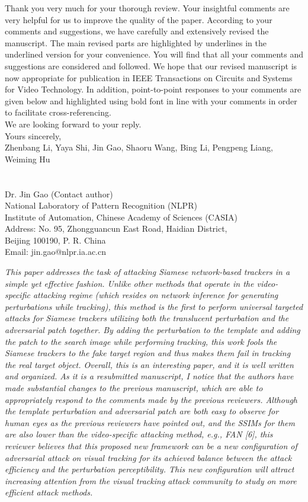 \documentclass[12pt]{article}
\begin{document}
Thank you very much for your thorough review. Your insightful comments are very helpful for us to improve the quality of the paper. According to your comments and suggestions, we have carefully and extensively revised the manuscript. The main revised parts are highlighted by underlines in the underlined version for your convenience. You will find that all your comments and suggestions are considered and followed. We hope that our revised manuscript is now appropriate for publication in IEEE Transactions on Circuits and Systems for Video Technology.
In addition, point-to-point responses to your comments are given below and highlighted using bold font in line with your comments in order to facilitate cross-referencing.\\[10pt]
\indent We are looking forward to your reply.\\[10pt]
\noindent Yours sincerely,\\
\noindent Zhenbang Li, Yaya Shi, Jin Gao, Shaoru Wang, Bing Li, Pengpeng Liang, Weiming Hu
\\
\\
\\
\noindent Dr. Jin Gao (Contact author)\\
\noindent National Laboratory of Pattern Recognition (NLPR)\\
\noindent Institute of Automation, Chinese Academy of Sciences (CASIA)\\
\noindent Address: No. 95, Zhongguancun East Road, Haidian District,\\
\noindent Beijing 100190, P. R. China\\
\noindent Email: jin.gao@nlpr.ia.ac.cn

\newpage
\textit{This paper addresses the task of attacking Siamese network-based trackers in a simple yet effective fashion. Unlike other methods that operate in the video-specific attacking regime (which resides on network inference for generating perturbations while tracking), this method is the first to perform universal targeted attacks for Siamese trackers utilizing both the translucent perturbation and the adversarial patch together. By adding the perturbation to the template and adding the patch to the search image while performing tracking, this work fools the Siamese trackers to the fake target region and thus makes them fail in tracking the real target object. Overall, this is an interesting paper, and it is well written and organized. As it is a resubmitted manuscript, I notice that the authors have made substantial changes to the previous manuscript, which are able to appropriately respond to the comments made by the previous reviewers. Although the template perturbation and adversarial patch are both easy to observe for human eyes as the previous reviewers have pointed out, and the SSIMs for them are also lower than the video-specific attacking method, e.g., FAN [6], this reviewer believes that this proposed new framework can be a new configuration of adversarial attack on visual tracking for its achieved balance between the attack efficiency and the perturbation perceptibility. This new configuration will attract increasing attention from the visual tracking attack community to study on more efficient attack methods.}
\end{document}
